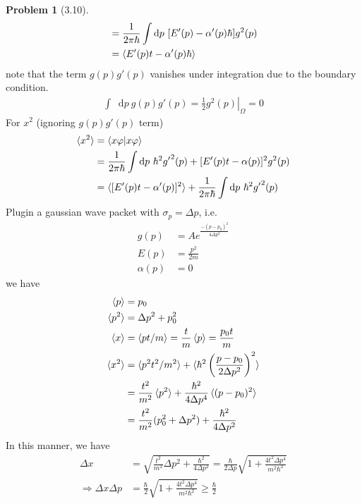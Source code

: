 \documentclass[twoside,11pt]{article}
\renewcommand*\d{\mathop{}\!\mathrm{d}}
\theoremstyle{definition}
\newtheorem{problem}{Problem}
\theoremstyle{remark}
\begin{document}
\begin{problem}[3.10]
\begin{align*}
        &= \frac{1}{2\pi\hbar}\int\d p\ [E'(p)-\alpha'(p)\hbar] g^2(p)\\
        &= \braket{E'(p)t-\alpha'(p)\hbar}
    \end{align*}
    note that the term $g(p)g'(p)$ vanishes under integration due to the boundary condition.
    \begin{align*}
        \int\d p\ g(p)g'(p) = \left. \frac{1}{2}g^2(p)\right |_\Omega = 0
    \end{align*}
    For $x^2$ (ignoring $g(p)g'(p)$ term)
    \begin{align*}
        \braket{x^2} &= \braket{x\varphi|x\varphi}\\
        &= \frac{1}{2\pi\hbar}\int\d p\ \hbar^2 {g'}^2(p) + [E'(p)t-\alpha(p)]^2 g^2(p)\\
        &= \braket{[E'(p)t-\alpha'(p)]^2} + \frac{1}{2\pi\hbar}\int\d p\ 
        \hbar^2 {g'}^2(p)
    \end{align*}
    Plugin a gaussian wave packet with $\sigma_p=\Delta p$, i.e.
    \begin{align*}
        g(p) &= Ae^{\frac{-(p-p_0)^2}{4\Delta p^2}}\\
        E(p) &= \frac{p^2}{2m}\\
        \alpha(p) &= 0
    \end{align*}
    we have
    \begin{align*}
        \braket{p} &= p_0\\
        \braket{p^2} &= \Delta p^2 + p_0^2\\
        \braket{x} &= \braket{pt/m} = \frac{t}{m}\braket{p} = \frac{p_0t}{m}\\
        \braket{x^2} &= \braket{p^2t^2/m^2} +
        \braket{\hbar^2\left(\frac{p-p_0}{2\Delta p^2}\right)^2}\\
        &= \frac{t^2}{m^2}\braket{p^2} + \frac{\hbar^2}{4\Delta p^4}\braket{(p-p_0)^2}\\
        &= \frac{t^2}{m^2}(p_0^2 + \Delta p^2) + \frac{\hbar^2}{4\Delta p^2}
    \end{align*}
    In this manner, we have
    \begin{align*}
        \Delta x &= \sqrt{\frac{t^2}{m^2}\Delta p^2 + \frac{\hbar^2}{4\Delta p^2}}
        = \frac{\hbar}{2\Delta p}\sqrt{1 + \frac{4t^2\Delta p^4}{m^2\hbar^2}}\\
        \Rightarrow
        \Delta x\Delta p &= 
        \frac{\hbar}{2}\sqrt{1 + \frac{4t^2\Delta p^4}{m^2\hbar^2}}\geq \frac{\hbar}{2}
    \end{align*}
\end{problem}
\end{document}
